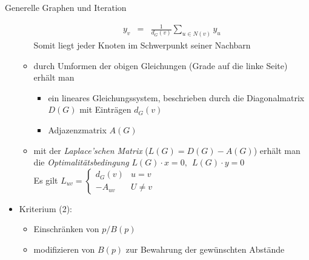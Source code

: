 \begin{TOP}{Generelle Graphen und Iteration}
\begin{itemize}[itemsep=-1pt]
\begin{itemize}
\begin{eqnarray*}
					y_v&=&\frac{1}{d_G(v)}\sum\limits_{u\in N(v)}y_u
				\end{eqnarray*}
				Somit liegt jeder Knoten im Schwerpunkt seiner Nachbarn
			\item durch Umformen der obigen Gleichungen (Grade auf die linke Seite) erhält man
				\begin{itemize}[itemsep=-1pt]
					\item ein lineares Gleichungssystem, beschrieben durch die Diagonalmatrix $D(G)$ mit Einträgen $d_G(v)$
					\item Adjazenzmatrix $A(G)$
				\end{itemize}
			\item mit der \textit{Laplace'schen Matrix} ($L(G)=D(G)-A(G)$) erhält man die \textit{Optimalitätsbedingung} $L(G)\cdot x=0,~~L(G)\cdot y =0$\\
				Es gilt $L_{uv}=\left\{\begin{array}{ll}
					d_G(v)&u=v\\
					-A_{uv}&U\neq v
				\end{array}\right.$
		\end{itemize}
	\item Kriterium (2):
		\begin{itemize}[itemsep=-1pt]
			\item Einschränken von $p/B(p)$
			\item modifizieren von $B(p)$ zur Bewahrung der gewünschten Abstände
		\end{itemize}
\end{itemize}
\end{TOP}